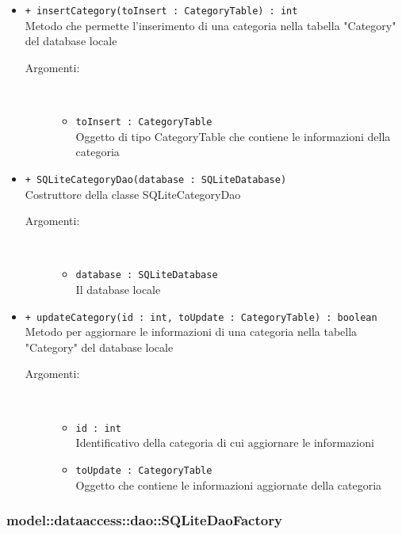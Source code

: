 \documentclass[../DefinizioneDiProdotto.tex]{subfiles}
\begin{document}
\begin{description}
\begin{itemize}
\begin{description}
\end{description}
\item \texttt{+ insertCategory(toInsert : CategoryTable) : int}\\
Metodo che permette l'inserimento di una categoria nella tabella "Category" del database locale
 \begin{description}
\item[Argomenti:] \
\begin{itemize}
\item \texttt{toInsert : CategoryTable}\\
Oggetto di tipo CategoryTable che contiene le informazioni della categoria\end{itemize}
\end{description}
\item \texttt{+ SQLiteCategoryDao(database : SQLiteDatabase)}\\
Costruttore della classe SQLiteCategoryDao
 \begin{description}
\item[Argomenti:] \
\begin{itemize}
\item \texttt{database : SQLiteDatabase}\\
Il database locale\end{itemize}
\end{description}
\item \texttt{+ updateCategory(id : int, toUpdate : CategoryTable) : boolean}\\
Metodo per aggiornare le informazioni di una categoria nella tabella "Category" del database locale
 \begin{description}
\item[Argomenti:] \
\begin{itemize}
\item \texttt{id : int}\\
Identificativo della categoria di cui aggiornare le informazioni\item \texttt{toUpdate : CategoryTable}\\
Oggetto che contiene le informazioni aggiornate della categoria\end{itemize}
\end{description}
\end{itemize}
\end{description}

\subsubsection{model::dataaccess::dao::SQLiteDaoFactory}
\end{document}
